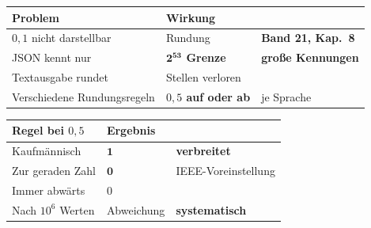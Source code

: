 \begin{merksatz}
\begin{center}
{\small
\renewcommand{\arraystretch}{1.5}
\begin{tabular}{@{}P{3.0cm}P{2.4cm}P{2.6cm}@{}}
\toprule
\textbf{Problem} & \textbf{Wirkung} & \\
\midrule
$0{,}1$ nicht darstellbar & \textcolor{akzent}{Rundung} & \textbf{Band 21, Kap.~8}\\
JSON kennt nur  & \textcolor{akzent}{\textbf{$\mathbf{2^{53}}$ Grenze}} & \textcolor{akzent}{\textbf{große Kennungen}}\\
Textausgabe rundet & \textcolor{akzent}{Stellen verloren} & \\
Verschiedene Rundungsregeln & \textcolor{akzent}{\textbf{$0{,}5$ auf oder ab}} & \textcolor{akzent}{je Sprache}\\
\bottomrule
\end{tabular}}
\end{center}

\begin{center}
\begin{minipage}{0.88\textwidth}
\end{minipage}
\end{center}

\begin{center}
\end{center}

\begin{warnung}
\begin{center}
{\small
\renewcommand{\arraystretch}{1.5}
\begin{tabular}{@{}P{3.0cm}P{2.2cm}P{2.6cm}@{}}
\toprule
\textbf{Regel bei $0{,}5$} & \textbf{Ergebnis} & \\
\midrule
Kaufmännisch & $\mathbf{1}$ & \textbf{verbreitet}\\
Zur geraden Zahl & $\mathbf{0}$ & \textcolor{gruen}{IEEE-Voreinstellung}\\
Immer abwärts & $0$ & \\
\midrule
Nach $10^6$ Werten & \textcolor{akzent}{Abweichung} & \textcolor{akzent}{\textbf{systematisch}}\\
\bottomrule
\end{tabular}}
\end{center}


\end{warnung}
\end{merksatz}
